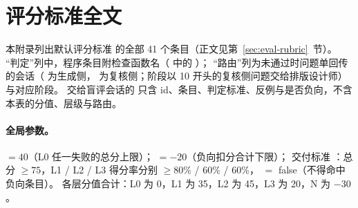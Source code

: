
\section{评分标准全文}
\label{app:rubric}

本附录列出默认评分标准  的全部 41 个条目（正文见第~\ref{sec:eval-rubric}~节）。
“判定”列中，程序条目附检查函数名（ 中的 ）；
“路由”列为未通过时问题单回传的会话（ 为生成侧， 为复核侧；阶段以 10 开头的复核侧问题交给排版设计师）与对应阶段。
交给盲评会话的  只含 id、条目、判定标准、反例与是否负向，不含本表的分值、层级与路由。

\paragraph{全局参数。}
 $=40$（L0 任一失败的总分上限）； $=-20$（负向扣分合计下限）；
交付标准 ：总分 $\ge 75$，L1 / L2 / L3 得分率分别 $\ge 80\%$ / $60\%$ / $60\%$， $=$ false（不得命中负向条目）。
各层分值合计：L0 为 0，L1 为 35，L2 为 45，L3 为 20，N 为 $-30$。

